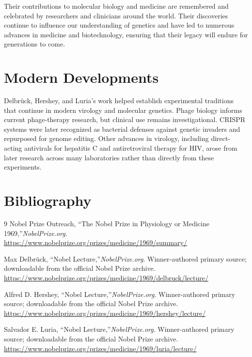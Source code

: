 Their contributions to molecular biology and medicine are remembered and celebrated by researchers and clinicians around the world. Their discoveries continue to influence our understanding of genetics and have led to numerous advances in medicine and biotechnology, ensuring that their legacy will endure for generations to come.


\section{Modern Developments}

Delbr\"uck, Hershey, and Luria's work helped establish experimental traditions that continue in modern virology and molecular genetics. Phage biology informs current phage-therapy research, but clinical use remains investigational. CRISPR systems were later recognized as bacterial defenses against genetic invaders and repurposed for genome editing. Other advances in virology, including direct-acting antivirals for hepatitis C and antiretroviral therapy for HIV, arose from later research across many laboratories rather than directly from these experiments.


\section{Bibliography}

\begin{thebibliography}{9}
Nobel Prize Outreach, ``The Nobel Prize in Physiology or Medicine 1969,''\emph{NobelPrize.org}.\\
\url{https://www.nobelprize.org/prizes/medicine/1969/summary/}

Max Delbr\"uck, ``Nobel Lecture,''\emph{NobelPrize.org}. Winner-authored primary source; downloadable from the official Nobel Prize archive.\\
\url{https://www.nobelprize.org/prizes/medicine/1969/delbruck/lecture/}

Alfred D. Hershey, ``Nobel Lecture,''\emph{NobelPrize.org}. Winner-authored primary source; downloadable from the official Nobel Prize archive.\\
\url{https://www.nobelprize.org/prizes/medicine/1969/hershey/lecture/}

Salvador E. Luria, ``Nobel Lecture,''\emph{NobelPrize.org}. Winner-authored primary source; downloadable from the official Nobel Prize archive.\\
\url{https://www.nobelprize.org/prizes/medicine/1969/luria/lecture/}
\end{thebibliography}
